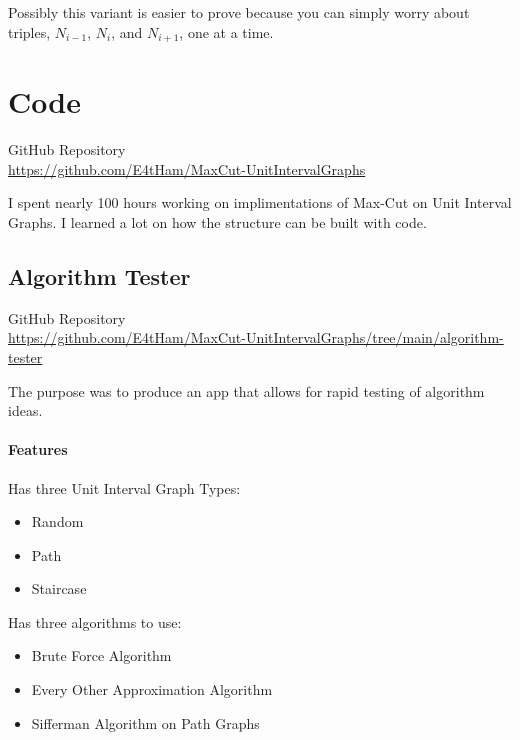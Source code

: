 \documentclass[12pt]{article}
\begin{document}
Possibly this variant is easier to prove because you can simply worry about triples, $N_{i-1}$, $N_{i}$, and $N_{i+1}$, one at a time.


\pagebreak


\section{Code}

\begin{center}
    GitHub Repository   \\
    \url{https://github.com/E4tHam/MaxCut-UnitIntervalGraphs}
\end{center}

I spent nearly 100 hours working on implimentations of Max-Cut on Unit Interval Graphs. I learned a lot on how the structure can be built with code.



\subsection{Algorithm Tester}

\begin{center}
    GitHub Repository   \\
    \url{https://github.com/E4tHam/MaxCut-UnitIntervalGraphs/tree/main/algorithm-tester}
\end{center}

The purpose was to produce an app that allows for rapid testing of algorithm ideas.

\pagebreak


\paragraph{Features} \leavevmode

Has three Unit Interval Graph Types:
\begin{itemize}
    \item Random
    \item Path
    \item Staircase
\end{itemize}

Has three algorithms to use:
\begin{itemize}
    \item Brute Force Algorithm
    \item Every Other Approximation Algorithm
    \item Sifferman Algorithm on Path Graphs
\end{itemize}
\end{document}
